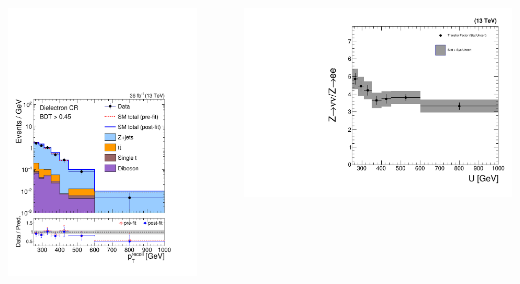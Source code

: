 \documentclass[aspectratio=169,xcolor=dvipsnames,,table,compress]{beamer}
\begin{document}
\begin{frame}
\begin{columns}
\begin{column}{0.3\textwidth}
      \includegraphics[width=\textwidth]{../figures/monotop/postfit/stackedPostfit_dielectron_monotop.pdf}
    \end{column}
    \begin{column}{0.05\textwidth} $=$  \end{column}
    \begin{column}{0.3\textwidth}
      \includegraphics[width=\textwidth]{../figures/monotop/xfer/rfactor_dielectron.pdf}

\end{column}
\end{columns}
\end{frame}
\end{document}
